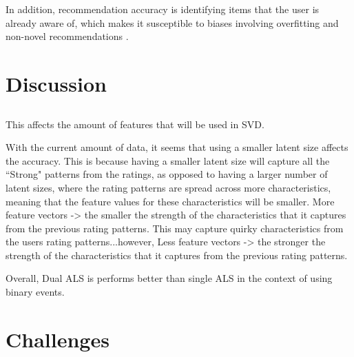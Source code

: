 In addition, recommendation accuracy is identifying items that the user is already aware of, which makes it susceptible to biases involving overfitting and non-novel recommendations \cite{evaluation}. 

\section{Discussion}

\subsection{}
This affects the amount of features that will be used in SVD.

With the current amount of data, it seems that using a smaller latent size affects the accuracy. This is because having a smaller latent size will capture all the ``Strong" patterns from the ratings, as opposed to having a larger number of latent sizes, where the rating patterns are spread across more characteristics, meaning that the feature values for these characteristics will be smaller. More feature vectors -> the smaller the strength of the characteristics that it captures from the previous rating patterns. This may capture quirky characteristics from the users rating patterns...however, Less feature vectors -> the stronger the strength of the characteristics that it captures from the previous rating patterns. 

Overall, Dual ALS is performs better than single ALS in the context of using binary events.

\section{Challenges}

